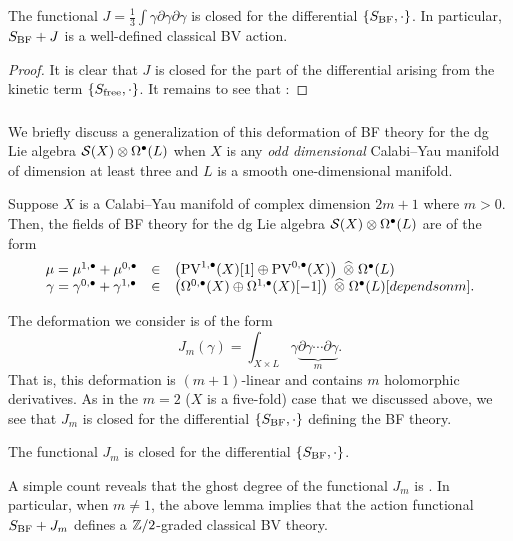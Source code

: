 \documentclass[11pt]{amsart}
\def\pv{{\rm PV}}
\begin{document}
\begin{lem}
  The functional $J = \frac13 \int \gamma \partial \gamma \partial \gamma$ is closed for the differential $\{S_{\rm BF},\cdot\}$.
  In particular, $S_{\rm BF} + J$ is a well-defined classical BV action.
\end{lem}
\begin{proof}
  It is clear that $J$ is closed for the part of the differential arising from the kinetic term $\{S_{\rm free},\cdot\}$.
  It remains to see that :
\end{proof}

\subsubsection{}

We briefly discuss a generalization of this deformation of BF theory for the dg Lie algebra $\mathcal S(X) \otimes \Omega^\bullet(L)$ when $X$ is any {\em odd dimensional} Calabi--Yau manifold of dimension at least three and $L$ is a smooth one-dimensional manifold.

Suppose $X$ is a Calabi--Yau manifold of complex dimension $2m+1$ where $m > 0$.
Then, the fields of BF theory for the dg Lie algebra $\mathcal S(X) \otimes \Omega^{\bullet}(L)$ are of the form
\[
  \begin{array}{ccl}
    \mu = \mu^{1,\bu}+\mu^{0,\bu} & \in & \left(\pv^{1,\bu}(X)[1] \oplus \pv^{0,\bu}(X) \right) \; \Hat{\otimes} \; \Omega^{\bu}(L) \\
    \gamma = \gamma^{0,\bu} + \gamma^{1,\bu} & \in & \left(\Omega^{0,\bu}(X) \oplus \Omega^{1,\bu}(X)[-1] \right) \; \Hat{\otimes}\; \Omega^{\bu}(L)[depends on m] .
  \end{array}
\]

The deformation we consider is of the form
\[
  J_m (\gamma) = \int_{X \times L} \gamma \underbrace{\partial \gamma \cdots \partial \gamma}_{m} .
\]
That is, this deformation is $(m+1)$-linear and contains $m$ holomorphic derivatives.
As in the $m=2$ ($X$ is a five-fold) case that we discussed above, we see that $J_m$ is closed for the differential $\{S_{\rm BF},\cdot\}$ defining the BF theory.

\begin{lem}
  The functional $J_m$ is closed for the differential $\{S_{\rm BF}, \cdot \}$.
\end{lem}

A simple count reveals that the ghost degree of the functional $J_m$ is .
In particular, when $m \ne 1$, the above lemma implies that the action functional $S_{\rm BF} + J_m$ defines a $\mathbb Z/2$-graded classical BV theory.
\end{document}
